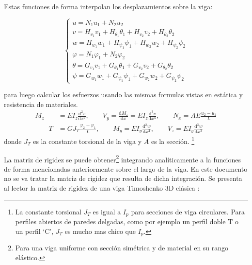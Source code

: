 \documentclass[11pt, a4paper,titlepage]{article}
\newcommand{\di}{\textrm{d}}
\begin{document}
Estas funciones de forma interpolan los desplazamientos sobre la viga:

\begin{equation} \label{eq:interpolacionFuncForma1D}
	\begin{cases}
	u=N_{1} u_{1}+N_{2} u_{2} \\
	v=H_{v_{1}} v_{1}+H_{\theta_{1}} \theta_{1}+H_{v_{2}} v_{2}+H_{\theta_{2}} \theta_{2} \\
	w=H_{w_{1}} w_{1}+H_{\psi_{1}} \psi_{1}+H_{w_{2}} w_{2}+H_{\psi_{2}} \psi_{2} \\
	\varphi=N_{1} \varphi_{1}+N_{2} \varphi_{2} \\
	\theta=G_{v_{1}} v_{1}+G_{\theta_{1}} \theta_{1}+G_{v_{2}} v_{2}+G_{\theta_{2}} \theta_{2} \\
	\psi=G_{w_{1}} w_{1}+G_{\psi_{1}} \psi_{1}+G_{w_{2}} w_{2}+G_{\psi_{2}} \psi_{2}
	\end{cases}
\end{equation} 



para luego calcular los esfuerzos usando las mismas formulas vistas en estática y resistencia de materiales.
\begin{align*}
	M_{z}&=E I_{z} \frac{\di^{2} v}{\di x^{2}}, \qquad V_{y}=\frac{\di M_{z}}{\di x}=E I_{z} \frac{\di^{3} v}{\di x^{3}}, \qquad N_x=A E \frac{u_{2}-u_{1}}{L} \\
	\qquad T&=G J_T \frac{\varphi_{2}-\varphi_{1}}{L}, \qquad M_{y}=E I_{y} \frac{\di^{2} w}{\di x^{2}}, \qquad V_{z}=E I_{y} \frac{\di^{3} w}{\di x^{3}}
\end{align*}
donde $J_T$ es la constante torsional de la viga y $A$ es la sección. \footnote{La constante torsional $J_T$ es igual a $I_p$ para secciones de viga circulares. Para perfiles abiertos de paredes delgadas, como por ejemplo un perfil doble T o un perfil `C', $J_T$ es mucho mas chico que $I_p$.}

La matriz de rigidez se puede obtener\footnote{Para una viga uniforme con sección simétrica y de  material en su rango elástico.} integrando analíticamente a la funciones de forma mencionadas anteriormente sobre el largo de la viga. En este documento no se va tratar la matriz de rigidez que resulta de dicha integración. Se presenta al lector la matriz de rigidez de una viga Timoshenko 3D clásica \cite{cook2007concepts}:
\end{document}
